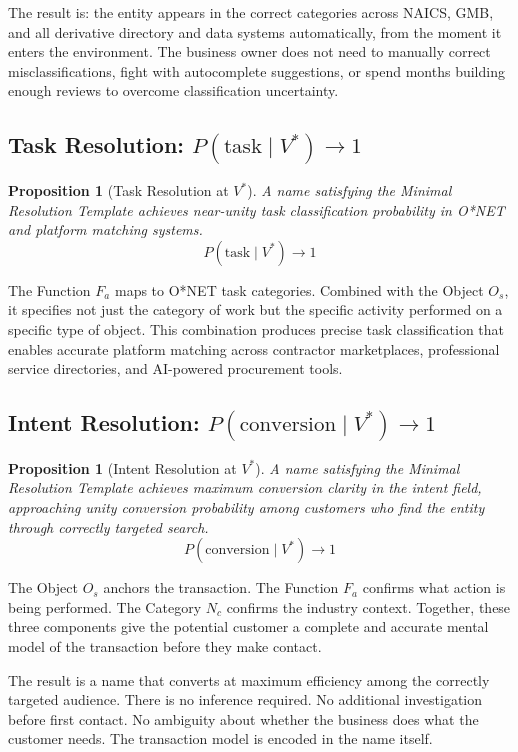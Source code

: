 \documentclass[12pt, openany]{book}
\theoremstyle{thmstyle}
\newtheorem{proposition}[theorem]{Proposition}
\theoremstyle{defstyle}
\newcommand{\vstar}{V^{*}}
\newcommand{\Nc}{N_c}
\newcommand{\Os}{O_s}
\newcommand{\Fa}{F_a}
\begin{document}
The result is: the entity appears in the correct categories across NAICS, GMB, and all derivative directory and data systems automatically, from the moment it enters the environment. The business owner does not need to manually correct misclassifications, fight with autocomplete suggestions, or spend months building enough reviews to overcome classification uncertainty.

\subsection{Task Resolution: $P(\text{task} \mid V^*) \to 1$}

\begin{proposition}[Task Resolution at $\vstar$]
A name satisfying the Minimal Resolution Template achieves near-unity task classification probability in O*NET and platform matching systems.
\[
P(\text{task} \mid \vstar) \to 1
\]
\end{proposition}

The Function $\Fa$ maps to O*NET task categories. Combined with the Object $\Os$, it specifies not just the category of work but the specific activity performed on a specific type of object. This combination produces precise task classification that enables accurate platform matching across contractor marketplaces, professional service directories, and AI-powered procurement tools.

\subsection{Intent Resolution: $P(\text{conversion} \mid V^*) \to 1$}

\begin{proposition}[Intent Resolution at $\vstar$]
A name satisfying the Minimal Resolution Template achieves maximum conversion clarity in the intent field, approaching unity conversion probability among customers who find the entity through correctly targeted search.
\[
P(\text{conversion} \mid \vstar) \to 1
\]
\end{proposition}

The Object $\Os$ anchors the transaction. The Function $\Fa$ confirms what action is being performed. The Category $\Nc$ confirms the industry context. Together, these three components give the potential customer a complete and accurate mental model of the transaction before they make contact.

The result is a name that converts at maximum efficiency among the correctly targeted audience. There is no inference required. No additional investigation before first contact. No ambiguity about whether the business does what the customer needs. The transaction model is encoded in the name itself.
\end{document}
